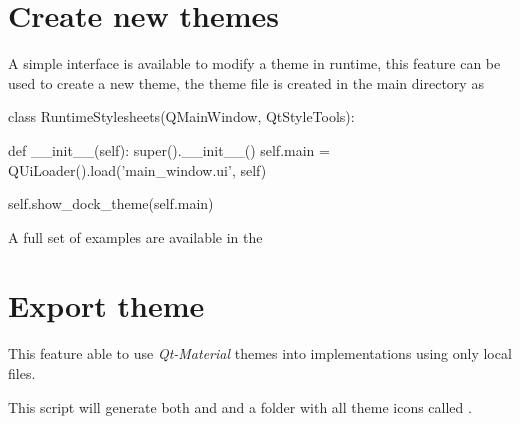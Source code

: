 \section{Create new themes}
A simple interface is available to modify a theme in runtime, this feature can be used to create a new theme, the theme file is created in the main directory as 
\begin{python}
class RuntimeStylesheets(QMainWindow, QtStyleTools):
    
    def __init__(self):
        super().__init__()
        self.main = QUiLoader().load('main_window.ui', self)
        
        self.show_dock_theme(self.main)
\end{python}
A full set of examples are available in the 

\section{Export theme}
This feature able to use \textit{Qt-Material} themes into  implementations using only local files.
This script will generate both  and  and a folder with all theme icons called .

